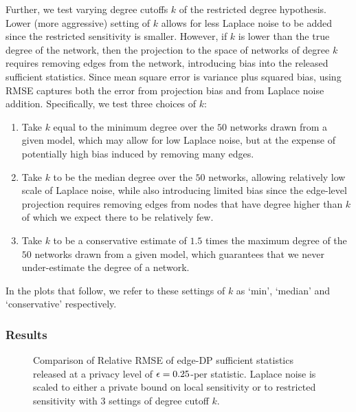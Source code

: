  Further, we test varying degree cutoffs $k$ of the restricted degree hypothesis. Lower (more aggressive) setting of $k$ allows for less Laplace noise to be added since the restricted sensitivity is smaller. However, if $k$ is lower than the true degree of the network, then the projection to the space of networks of degree $k$ requires removing edges from the network, introducing bias into the released sufficient statistics.  Since mean square error is variance plus squared bias, using RMSE captures both the error from projection bias and from Laplace noise addition. Specifically, we test three choices of $k$:
 \vspace{-0.2in}
\begin{enumerate}
	\item Take $k$ equal to the minimum degree over the $50$ networks drawn from a given model, which may allow for low Laplace noise, but at the expense of potentially high bias induced by removing many edges.
	\item Take $k$ to be the median degree over the $50$ networks, allowing relatively low scale of Laplace noise, while also introducing limited bias since the edge-level projection  requires removing edges from nodes that have degree higher than $k$ of which we expect there to be relatively few.
	\item Take $k$ to be a conservative estimate of $1.5$ times the maximum degree of the $50$ networks drawn from a given model, which guarantees that we never under-estimate the degree of a network. 
\end{enumerate}
In the plots that follow, we refer to these settings of $k$ as `min', `median' and `conservative' respectively.

 \subsubsection{Results}
 \begin{figure}[hp]
 	\caption{Comparison of Relative RMSE of edge-DP sufficient statistics released at a privacy level of $\epsilon = 0.25$-per statistic. Laplace noise is scaled to either a private bound on local sensitivity or to restricted sensitivity with $3$ settings of degree cutoff $k$.}
 	\label{fig:edge_noise}
 	\centering
 	
 \end{figure}
 
